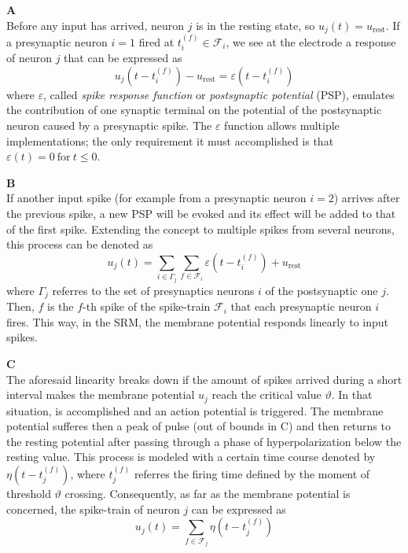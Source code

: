 \begin{description}

\item {\textbf{ A}\hfill \\
Before any input has arrived, neuron $j$ is in the resting state, so $u_{j}(t)=u_{\text{rest}}$.
If a presynaptic neuron $i=1$ fired at $t_{i}^{(f)} \in \mathcal{F}_{i}$, we see at the electrode a response of neuron $j$ that can be expressed as
\begin{equation}
u_{j}(t-t_{i}^{(f)})-u_{\text{rest}}=\varepsilon(t-t_{i}^{(f)})
\label{eq:postsynapticpotential}
\end{equation}
where $\varepsilon$, called \emph{spike response function}
or \emph{postsynaptic potential} (PSP), 
emulates the contribution of one synaptic terminal on the potential of the postsynaptic neuron caused by a presynaptic spike. The $\varepsilon$ function allows multiple implementations; the only requirement it must accomplished is that $\varepsilon(t)=0~\text{for}~t\leq 0$.
}

\item {\textbf{ B}\hfill \\
If another input spike (for example from a presynaptic neuron $i=2$) arrives after the previous spike, a new PSP will be evoked and its effect will be added to that of the first spike. Extending the concept to multiple spikes from several neurons, this process can be denoted as
\begin{equation}
u_{j}(t)=\sum_{i\in \Gamma_{j}}\sum_{f\in \mathcal{F}_{i}}
	\varepsilon(t-t_{i}^{(f)})+u_{\text{rest}}
\label{eq:pspgeneralised}
\end{equation}
where $\Gamma_{j}$ referres to the set of presynaptics neurons $i$ of the postsynaptic one $j$. Then, $f$ is the $f$-th spike of the spike-train $\mathcal{F}_{i}$ that each presynaptic neuron $i$ fires. This way, in the SRM, the membrane potential responds linearly to input spikes.
}

\item {\textbf{ C}\hfill \\
The aforesaid linearity breaks down if the amount of spikes arrived during a short interval makes the membrane potential $u_{j}$ reach the critical value $\vartheta$. In that situation,  is accomplished and an action potential is triggered. The membrane potential sufferes then a peak of pulse (out of bounds in  C) and then returns to the resting potential after passing through a phase of hyperpolarization below the resting value. This 
process is modeled with a certain time course denoted by $\eta(t-t_{j}^{(f)})$, where $t_{j}^{(f)}$ referres the firing time defined by the moment of threshold $\vartheta$ crossing.
Consequently, as far as the membrane potential is concerned, the spike-train of neuron $j$ can be expressed as
\begin{equation}
u_{j}(t)=\sum_{f\in \mathcal{F}_{j}}\eta(t-t_{j}^{(f)})
\label{eq:refractoriness}
\end{equation}

}
\end{description}
